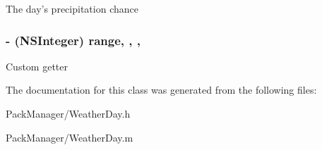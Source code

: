 The day's precipitation chance \hypertarget{interface_weather_day_ade050fc16334cf7cac350d222ff1a026}{
\subsubsection[{range}]{\setlength{\rightskip}{0pt plus 5cm}-\/ (N\-S\-Integer) range\hspace{0.3cm}{\ttfamily [read]}, {\ttfamily [write]}, {\ttfamily [nonatomic]}, {\ttfamily [assign]}}}\label{interface_weather_day_ade050fc16334cf7cac350d222ff1a026}
Custom getter 

The documentation for this class was generated from the following files\-:\begin{DoxyCompactItemize}
\item 
Pack\-Manager/Weather\-Day.\-h\item 
Pack\-Manager/Weather\-Day.\-m\end{DoxyCompactItemize}

